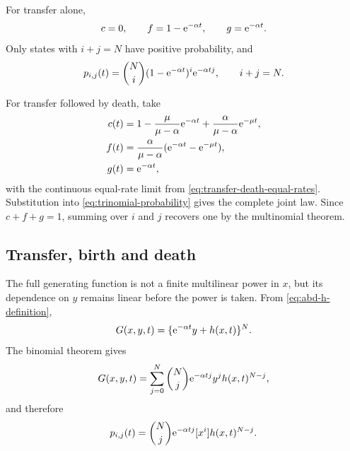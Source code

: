 For transfer alone,
\begin{equation}
  c=0,\qquad
  f=1-\mathrm{e}^{-\alpha t},\qquad
  g=\mathrm{e}^{-\alpha t}.
\end{equation}
Only states with \(i+j=N\) have positive probability, and
\begin{equation}
  p_{i,j}(t)
  =\binom Ni
   (1-\mathrm{e}^{-\alpha t})^i
   \mathrm{e}^{-\alpha tj},
  \qquad i+j=N.
  \label{eq:transfer-only-coefficients}
\end{equation}

For transfer followed by death, take
\begin{align}
  c(t)
  &=1-\frac{\mu}{\mu-\alpha}\mathrm{e}^{-\alpha t}
       +\frac{\alpha}{\mu-\alpha}\mathrm{e}^{-\mu t},
  \notag\\
  f(t)
  &=\frac{\alpha}{\mu-\alpha}
    (\mathrm{e}^{-\alpha t}-\mathrm{e}^{-\mu t}),
  \notag\\
  g(t)&=\mathrm{e}^{-\alpha t},
  \label{eq:transfer-death-cfg}
\end{align}
with the continuous equal-rate limit from
\cref{eq:transfer-death-equal-rates}.  Substitution into
\cref{eq:trinomial-probability} gives the complete joint law.  Since
\(c+f+g=1\), summing over \(i\) and \(j\) recovers one by the multinomial theorem.

\subsection{Transfer, birth and death}

The full generating function is not a finite multilinear power in \(x\), but its
dependence on \(y\) remains linear before the power is taken.  From
\cref{eq:abd-h-definition},
\begin{equation}
  G(x,y,t)
  =\{\mathrm{e}^{-\alpha t}y+h(x,t)\}^{N}.
\end{equation}
The binomial theorem gives
\begin{equation}
  G(x,y,t)
  =\sum_{j=0}^{N}
   \binom Nj
   \mathrm{e}^{-\alpha tj}y^j
   h(x,t)^{N-j},
\end{equation}
and therefore
\begin{equation}
  p_{i,j}(t)
  =\binom Nj\mathrm{e}^{-\alpha tj}
   [x^i]h(x,t)^{N-j}.
  \label{eq:appendix-abd-coefficients}
\end{equation}

